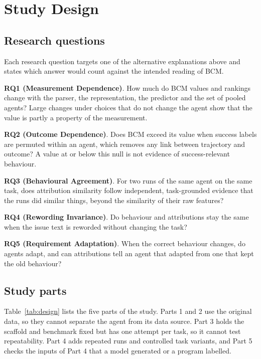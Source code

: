 \documentclass[conference]{IEEEtran}
\newcommand{\bcm}{\textsc{BCM}}
\newcommand{\RQ}[2]{\textbf{RQ#1 (#2)}}
\begin{document}
\section{Study Design}
\label{sec:design}
\subsection{Research questions}
Each research question targets one of the alternative explanations above and states which answer would count against the intended reading of \bcm.

\RQ{1}{Measurement Dependence}. How much do \bcm{} values and rankings change with the parser, the representation, the predictor and the set of pooled agents? Large changes under choices that do not change the agent show that the value is partly a property of the measurement.

\RQ{2}{Outcome Dependence}. Does \bcm{} exceed its value when success labels are permuted within an agent, which removes any link between trajectory and outcome? A value at or below this null is not evidence of success-relevant behaviour.

\RQ{3}{Behavioural Agreement}. For two runs of the same agent on the same task, does attribution similarity follow independent, task-grounded evidence that the runs did similar things, beyond the similarity of their raw features?

\RQ{4}{Rewording Invariance}. Do behaviour and attributions stay the same when the issue text is reworded without changing the task?

\RQ{5}{Requirement Adaptation}. When the correct behaviour changes, do agents adapt, and can attributions tell an agent that adapted from one that kept the old behaviour?

\subsection{Study parts}
Table~\ref{tab:design} lists the five parts of the study. Parts 1 and 2 use the original data, so they cannot separate the agent from its data source. Part 3 holds the scaffold and benchmark fixed but has one attempt per task, so it cannot test repeatability. Part 4 adds repeated runs and controlled task variants, and Part 5 checks the inputs of Part 4 that a model generated or a program labelled.
\end{document}
